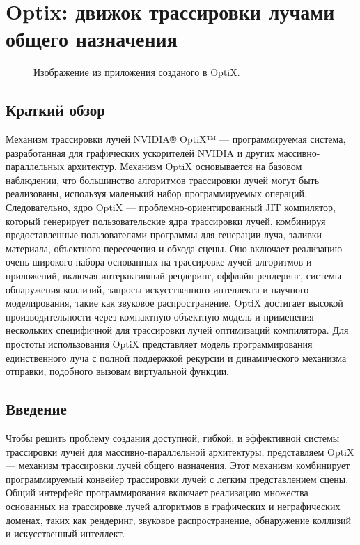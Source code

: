 \section{Optix: движок трассировки лучами общего назначения}
\begin{figure}[h]
\caption{Изображение из приложения созданого в OptiX.}
\label{audi}
\end{figure}
\subsection{Краткий обзор}
Механизм трассировки лучей NVIDIA® OptiX™ --- программируемая система, разработанная для графических ускорителей NVIDIA и других массивно-параллельных архитектур.
Механизм OptiX основывается на базовом наблюдении, что большинство алгоритмов трассировки лучей могут быть реализованы, используя маленький набор программируемых операций. 
Следовательно, ядро OptiX --- проблемно-ориентированный JIT компилятор, который генерирует пользовательские ядра трассировки лучей, комбинируя предоставленные пользователями программы для генерации луча, заливки материала, объектного пересечения и обхода сцены. 
Оно включает реализацию очень широкого набора основанных на трассировке лучей алгоритмов и приложений, включая интерактивный рендеринг, оффлайн рендеринг, системы обнаружения коллизий, запросы искусственного интеллекта и научного моделирования, такие как звуковое распространение. 
OptiX достигает высокой производительности через компактную объектную модель и применения нескольких специфичной для трассировки лучей оптимизаций компилятора. 
Для простоты использования OptiX представляет модель программирования единственного луча с полной поддержкой рекурсии и динамического механизма отправки, подобного вызовам виртуальной функции.

\subsection{Введение}
Чтобы решить проблему создания доступной, гибкой, и эффективной системы трассировки лучей для массивно-параллельной архитектуры, представляем OptiX --- механизм трассировки лучей общего назначения. 
Этот механизм комбинирует программируемый конвейер трассировки лучей с легким представлением сцены. 
Общий интерфейс программирования включает реализацию множества основанных на трассировке лучей алгоритмов в графических и неграфических доменах, таких как рендеринг, звуковое распространение, обнаружение коллизий и искусственный интеллект.


